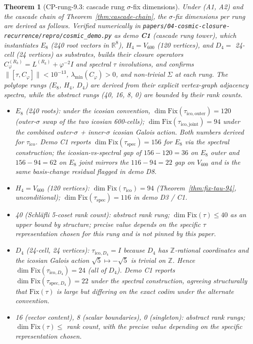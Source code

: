 \documentclass[11pt]{article}
\theoremstyle{plain}
\newtheorem{theorem}{Theorem}[section]
\theoremstyle{definition}
\theoremstyle{remark}
\newcommand{\Fix}{\mathrm{Fix}}
\newcommand{\Cph}{C_\varphi}
\begin{document}
\begin{theorem}[CP-rung-9.3: cascade rung $\sigma$-fix dimensions]\label{thm:cp-rung-9-3}
Under (A1, A2) and the cascade chain of Theorem~\ref{thm:cascade-chain}, the $\sigma$-fix dimensions per rung are derived as follows. Verified numerically in \texttt{papers/04-cosmic-closure-recurrence/repro/cosmic\_demo.py} as demo \textbf{C1} (cascade rung tower), which instantiates $E_8$ (240 root vectors in $\mathbb{R}^8$), $H_4 = V_{600}$ (120 vertices), and $D_4 =$ 24-cell (24 vertices) as substrates, builds their closure operators $\Cph^{(R_k)} = L^{(R_k)} + \varphi^{-2} I$ and spectral $\tau$ involutions, and confirms $\|[\tau, \Cph]\| < 10^{-13}$, $\lambda_{\min}(\Cph) > 0$, and non-trivial $\Sigma$ at each rung. The polytope rungs (\texorpdfstring{$E_8$}{E\_8}, \texorpdfstring{$H_4$}{H\_4}, \texorpdfstring{$D_4$}{D\_4}) are derived from their explicit vertex-graph adjacency spectra, while the abstract rungs (40, 16, 8, 0) are bounded by their rank counts.

\begin{itemize}[leftmargin=2em]
\item $E_8$ (240 roots): under the icosian convention, $\dim \Fix(\tau_{\mathrm{ico,outer}}) = 120$ (outer-$\sigma$ swap of the two icosian 600-cells); $\dim \Fix(\tau_{\mathrm{ico,joint}}) = 94$ under the combined outer-$\sigma$ + inner-$\sigma$ icosian Galois action. Both numbers derived for $\tau_{\mathrm{ico}}$. Demo C1 reports $\dim \Fix(\tau_{\mathrm{spec}}) = 156$ for $E_8$ via the spectral construction; the icosian-vs-spectral gap of $156 - 120 = 36$ on $E_8$ outer and $156 - 94 = 62$ on $E_8$ joint mirrors the $116 - 94 = 22$ gap on $V_{600}$ and is the same basis-change residual flagged in demo D8.
\item $H_4 = V_{600}$ (120 vertices): $\dim \Fix(\tau_{\mathrm{ico}}) = 94$ (Theorem~\ref{thm:fix-tau-94}, unconditional); $\dim \Fix(\tau_{\mathrm{spec}}) = 116$ in demo D3 / C1.
\item 40 (Schläfli 5-coset rank count): abstract rank rung; $\dim \Fix(\tau) \leq 40$ as an upper bound by structure; precise value depends on the specific $\tau$ representation chosen for this rung and is not pinned by this paper.
\item $D_4$ (24-cell, 24 vertices): $\tau_{\mathrm{ico},D_4} = I$ because $D_4$ has $\mathbb{Z}$-rational coordinates and the icosian Galois action $\sqrt 5 \mapsto -\sqrt 5$ is trivial on $\mathbb{Z}$. Hence $\dim \Fix(\tau_{\mathrm{ico},D_4}) = 24$ (all of $D_4$). Demo C1 reports $\dim \Fix(\tau_{\mathrm{spec},D_4}) = 22$ under the spectral construction, agreeing structurally that $\Fix(\tau)$ is large but differing on the exact codim under the alternate convention.
\item 16 (vector content), 8 (scalar boundaries), 0 (singleton): abstract rank rungs; $\dim \Fix(\tau) \leq$ rank count, with the precise value depending on the specific representation chosen.
\end{itemize}
\end{theorem}
\end{document}
